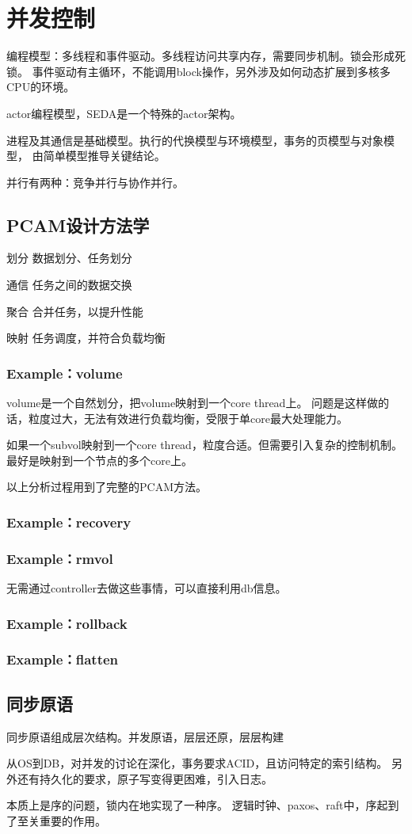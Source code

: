 \chapter{并发控制}

编程模型：多线程和事件驱动。多线程访问共享内存，需要同步机制。锁会形成死锁。
事件驱动有主循环，不能调用block操作，另外涉及如何动态扩展到多核多CPU的环境。

actor编程模型，SEDA是一个特殊的actor架构。

进程及其通信是基础模型。执行的代换模型与环境模型，事务的页模型与对象模型，
由简单模型推导关键结论。

并行有两种：竞争并行与协作并行。

\section{PCAM设计方法学}

\begin{enumbox}
\item 划分 数据划分、任务划分
\item 通信 任务之间的数据交换
\item 聚合 合并任务，以提升性能
\item 映射 任务调度，并符合负载均衡
\end{enumbox}

\subsection{Example：volume}

volume是一个自然划分，把volume映射到一个core thread上。
问题是这样做的话，粒度过大，无法有效进行负载均衡，受限于单core最大处理能力。

如果一个subvol映射到一个core thread，粒度合适。但需要引入复杂的控制机制。
最好是映射到一个节点的多个core上。

以上分析过程用到了完整的PCAM方法。

\subsection{Example：recovery}

\subsection{Example：rmvol}

无需通过controller去做这些事情，可以直接利用db信息。

\subsection{Example：rollback}

\subsection{Example：flatten}

\section{同步原语}

同步原语组成层次结构。并发原语，层层还原，层层构建

从OS到DB，对并发的讨论在深化，事务要求ACID，且访问特定的索引结构。
另外还有持久化的要求，原子写变得更困难，引入日志。

本质上是序的问题，锁内在地实现了一种序。
逻辑时钟、paxos、raft中，序起到了至关重要的作用。
